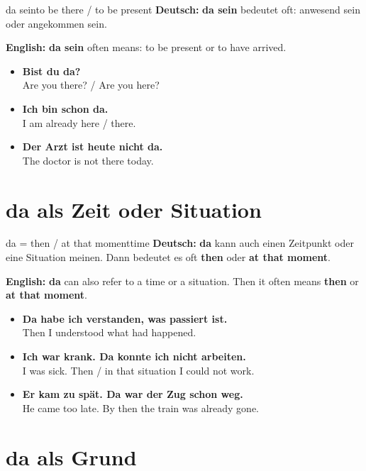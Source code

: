 \documentclass[a4paper,11pt]{article}
\newcommand{\GermanText}[1]{\textbf{Deutsch: }#1\par}
\newcommand{\EnglishText}[1]{{\small\color{SoftGray}\textbf{English: }#1\par}}
\newcommand{\ExampleItem}[2]{\item \textbf{#1}\\{\small\color{SoftGray}#2}}
\begin{document}
\begin{grammarentry}{da sein}{to be there / to be present}
\GermanText{\textbf{da sein} bedeutet oft: anwesend sein oder angekommen sein.}
\EnglishText{\textbf{da sein} often means: to be present or to have arrived.}

\begin{exbox}
\begin{itemize}
    \ExampleItem{Bist du da?}{Are you there? / Are you here?}
    \ExampleItem{Ich bin schon da.}{I am already here / there.}
    \ExampleItem{Der Arzt ist heute nicht da.}{The doctor is not there today.}
\end{itemize}
\end{exbox}
\end{grammarentry}

\section{da als Zeit oder Situation}

\begin{grammarentry}{da = then / at that moment}{time}
\GermanText{\textbf{da} kann auch einen Zeitpunkt oder eine Situation meinen. Dann bedeutet es oft \textbf{then} oder \textbf{at that moment}.}
\EnglishText{\textbf{da} can also refer to a time or a situation. Then it often means \textbf{then} or \textbf{at that moment}.}

\begin{exbox}
\begin{itemize}
    \ExampleItem{Da habe ich verstanden, was passiert ist.}{Then I understood what had happened.}
    \ExampleItem{Ich war krank. Da konnte ich nicht arbeiten.}{I was sick. Then / in that situation I could not work.}
    \ExampleItem{Er kam zu spät. Da war der Zug schon weg.}{He came too late. By then the train was already gone.}
\end{itemize}
\end{exbox}
\end{grammarentry}

\section{da als Grund}
\end{document}
